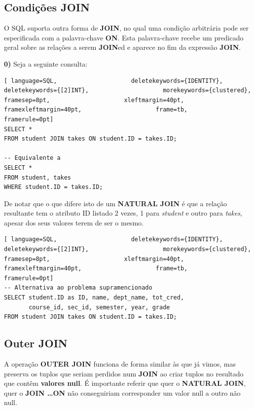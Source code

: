 \documentclass[oneside]{book}
\theoremstyle{definition}
\begin{document}
\subsection{Condições JOIN}
O SQL suporta outra forma de \textbf{JOIN}, no qual uma condição arbitrária pode ser especificada com a palavra-chave \textbf{ON}. Esta palavra-chave recebe um predicado geral sobre as relações a serem \textbf{JOIN}ed e aparece no fim da expressão \textbf{JOIN}.

\textbf{0)} Seja a seguinte consulta:
\begin{lstlisting}[ language=SQL,                     deletekeywords={IDENTITY},                     deletekeywords={[2]INT},                     morekeywords={clustered},                     framesep=8pt,                     xleftmargin=40pt,                     framexleftmargin=40pt,                     frame=tb,                     framerule=0pt]
SELECT *
FROM student JOIN takes ON student.ID = takes.ID;

-- Equivalente a
SELECT *
FROM student, takes
WHERE student.ID = takes.ID;
\end{lstlisting}

De notar que o que difere isto de um \textbf{NATURAL JOIN} é que a relação resultante tem o atributo ID listado 2 vezes, 1 para \textit{student} e outro para \textit{takes}, apesar dos seus valores terem de ser o mesmo.
\begin{lstlisting}[ language=SQL,                     deletekeywords={IDENTITY},                     deletekeywords={[2]INT},                     morekeywords={clustered},                     framesep=8pt,                     xleftmargin=40pt,                     framexleftmargin=40pt,                     frame=tb,                     framerule=0pt]
-- Alternativa ao problema supramencionado
SELECT student.ID as ID, name, dept_name, tot_cred, 
       course_id, sec_id, semester, year, grade
FROM student JOIN takes ON student.ID = takes.ID;
\end{lstlisting}

\subsection{Outer JOIN}
A operação \textbf{OUTER JOIN} funciona de forma similar às que já vimos, mas preserva os tuplos que seriam perdidos num \textbf{JOIN} ao criar tuplos no resultado que contêm \textbf{valores null}. É importante referir que quer o \textbf{NATURAL JOIN}, quer o \textbf{JOIN \dots ON} não conseguiriam corresponder um valor null a outro não null.
\end{document}
